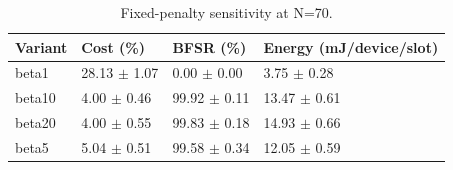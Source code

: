 \begin{table}[t]
\centering
\caption{Fixed-penalty sensitivity at N=70.}
\label{tab:penalty_sensitivity}
\begin{tabular}{llll}
\toprule
Variant & Cost (\%) & BFSR (\%) & Energy (mJ/device/slot) \\
\midrule
beta1 & 28.13 $\pm$ 1.07 & 0.00 $\pm$ 0.00 & 3.75 $\pm$ 0.28 \\
beta10 & 4.00 $\pm$ 0.46 & 99.92 $\pm$ 0.11 & 13.47 $\pm$ 0.61 \\
beta20 & 4.00 $\pm$ 0.55 & 99.83 $\pm$ 0.18 & 14.93 $\pm$ 0.66 \\
beta5 & 5.04 $\pm$ 0.51 & 99.58 $\pm$ 0.34 & 12.05 $\pm$ 0.59 \\
\bottomrule
\end{tabular}
\end{table}
